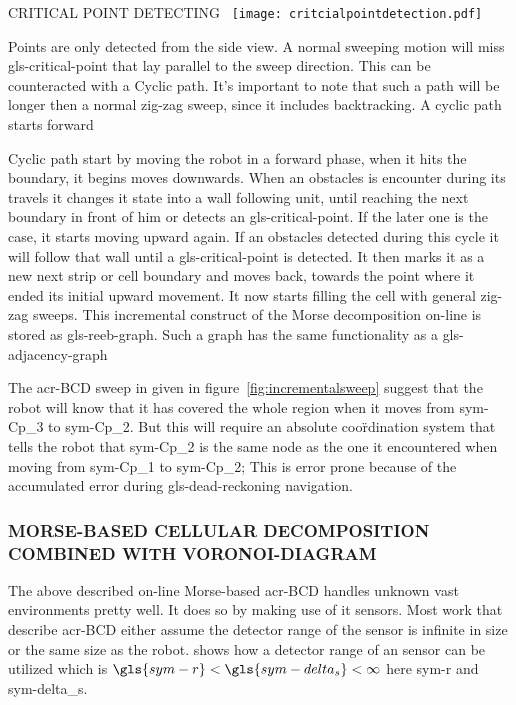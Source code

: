 \begin{RoyalFigure}[!htb, label=fig:criticalpointdetectiononline]{CRITICAL POINT DETECTING~\cite{galceran_survey_2013}}
    \texttt{[image: critcialpointdetection.pdf]}
\end{RoyalFigure}

Points are only detected from the side view. A normal sweeping motion will miss \gls{gls-critical-point} that lay
parallel to the sweep direction. This can be counteracted with a Cyclic path. It's important to note that such a path
will be longer then a normal zig-zag sweep, since it includes backtracking. A cyclic path starts forward

Cyclic path start by moving the robot in a forward phase, when it hits the boundary, it begins moves downwards. When an
obstacles is encounter during its travels it changes it state into a wall following unit, until reaching the next
boundary in front of him or detects an \gls{gls-critical-point}. If the later one is the case, it starts moving upward
again. If an obstacles detected during this cycle it will follow that wall until a \gls{gls-critical-point} is detected.
It then marks it as a new next strip or cell boundary and moves back, towards the point where it ended its initial 
upward
movement. It now starts filling the cell with general zig-zag sweeps. This incremental construct of the Morse
decomposition on-line is stored as \gls{gls-reeb-graph}. Such a graph has the same functionality as a
\gls{gls-adjacency-graph}

The \gls{acr-BCD} sweep in given in figure~\ref{fig:incrementalsweep} suggest that the robot will know that it has
covered the whole region when it moves from \gls{sym-Cp_3} to \gls{sym-Cp_2}. But this will require an absolute
coo\"rdination system that tells the robot that \gls{sym-Cp_2} is the same node as the one it encountered when moving
from \gls{sym-Cp_1} to \gls{sym-Cp_2}; This is error prone because of the accumulated error during
\gls{gls-dead-reckoning} navigation.

\subsubsection{MORSE-BASED CELLULAR DECOMPOSITION COMBINED WITH VORONOI-DIAGRAM}
The above described on-line Morse-based \gls{acr-BCD} handles unknown vast environments pretty well. It does so
by making use of it sensors. Most work that describe \gls{acr-BCD} either assume the detector range of the sensor is
infinite in size or the same size as the robot. \citet{acar_complete_2001} shows how a detector range of an sensor can
be utilized which is \( \gls{sym-r}  < \gls{sym-delta_s}  < \infty \) here \gls{sym-r} and
\gls{sym-delta_s}.

